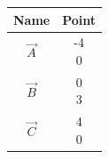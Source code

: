 \begin{tabular}[12pt]{ |c| c|}
    \hline
    \textbf{Name} & \textbf{Point}\\ 
    \hline
	$\vec{A}$ & \myvec{-4\\0}\\
    \hline 
	$\vec{B}$ & \myvec{0\\3}\\
    \hline
	$\vec{C}$ & \myvec{4\\0}\\
    \hline
    \end{tabular}